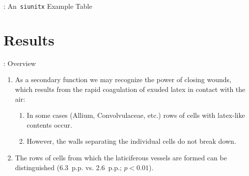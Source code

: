 \begin{frame}{\titleprefix: An~\texttt{siunitx} Example Table}


\smallskip
\begin{table}
	\caption{%
		Overview of the choice lists presented to subjects \\
		\citep[adapted from][]{Gerhardt2017}.%
	}
	\label{tab:choice_lists}%
	\vspace{-\smallskipamount}%
\end{table}%

\end{frame}


\section{Results}


\begin{frame}{\titleprefix: Overview}

\begin{enumerate}
	\item<1-> As a secondary function we may recognize the power of closing wounds, which results from the rapid coagulation of exuded latex in contact with the air:
	\begin{enumerate}
		\item<2-> In some cases (Allium, Convolvulaceae, etc.) rows of cells with latex-like contents occur.
		\item<2-> However, the walls separating the individual cells do not break down.
	\end{enumerate}
	\item<3-> The rows of cells from which the laticiferous vessels are formed can be distinguished (6.3~p.p. vs. 2.6~p.p.; ${p < 0.01}$).
\end{enumerate}

\end{frame}


